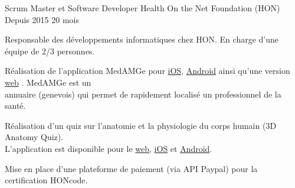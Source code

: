 
\begin{cventries}

  \cventry
    {Scrum Master et Software Developer}
    {Health On the Net Foundation (HON)}
    {Depuis 2015}
    {20 mois}
    {
      \begin{cvitems}
        \item{Responsable des développements informatiques chez HON. En charge d'une
          équipe de 2/3 personnes.
        }
        \item{Réalisation de l'application MedAMGe pour
          {\color{awesome-skyblue}
            \href{https://itunes.apple.com/us/app/medamge/id469762154?mt=8}{iOS}},
          {\color{awesome-skyblue}
            \href{https://play.google.com/store/apps/details?id=org.healthonnet.medamge.android&hl=en}{Android}}
          ainsi qu'une version
          {\color{awesome-skyblue}
            \href{https://www.medamge.ch}{web}}
          . MedAMGe est un \\annuaire (genevois) qui permet de rapidement localisé
          un professionnel de la santé.
        }
        \item{Réalisation d'un quiz sur l'anatomie et la physiologie du corps
          humain (3D Anatomy Quiz). \\L'application est disponible pour le
          {\color{awesome-skyblue}
            \href{https://3danatomyquiz.kaahe.org}{web}},
          {\color{awesome-skyblue}
            \href{https://itunes.apple.com/us/app/t-rf-ly-jsdk/id1020122013?mt=8}{iOS}}
          et
          {\color{awesome-skyblue}
            \href{https://play.google.com/store/apps/details?id=org.kaahe.anatomyQuiz&hl=en}{Android}}.
        }
        \item{Mise en place d'une plateforme de paiement (via API Paypal)
          pour la certification HONcode.
        }
      \end{cvitems}
    }


\end{cventries}
